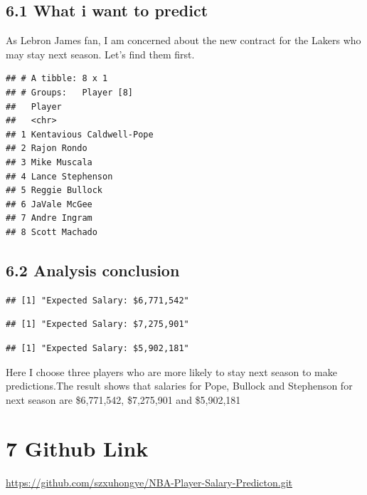 \documentclass[]{article}
\begin{document}
\subsection{6.1 What i want to predict}\label{what-i-want-to-predict}

As Lebron James fan, I am concerned about the new contract for the
Lakers who may stay next season. Let's find them first.

\begin{verbatim}
## # A tibble: 8 x 1
## # Groups:   Player [8]
##   Player                  
##   <chr>                   
## 1 Kentavious Caldwell-Pope
## 2 Rajon Rondo             
## 3 Mike Muscala            
## 4 Lance Stephenson        
## 5 Reggie Bullock          
## 6 JaVale McGee            
## 7 Andre Ingram            
## 8 Scott Machado
\end{verbatim}

\subsection{6.2 Analysis conclusion}\label{analysis-conclusion}

\begin{verbatim}
## [1] "Expected Salary: $6,771,542"
\end{verbatim}

\begin{verbatim}
## [1] "Expected Salary: $7,275,901"
\end{verbatim}

\begin{verbatim}
## [1] "Expected Salary: $5,902,181"
\end{verbatim}

Here I choose three players who are more likely to stay next season to
make predictions.The result shows that salaries for Pope, Bullock and
Stephenson for next season are \$6,771,542, \$7,275,901 and \$5,902,181

\section{7 Github Link}\label{github-link}

\url{https://github.com/szxuhongye/NBA-Player-Salary-Predicton.git}
\end{document}
